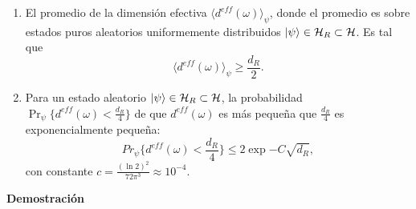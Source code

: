 \begin{theorem}\label{teorema2}

\begin{enumerate}

\item El promedio de la dimensión efectiva $\langle d^{eff}(\omega) \rangle_{\psi}$, donde el promedio es sobre estados puros aleatorios uniformemente distribuidos $\ket{\psi} \in \mathcal{H}_{R} \subset \mathcal{H}$. Es tal que
\begin{equation}
\langle d^{eff}(\omega) \rangle_{\psi} \ge \frac{d_{R}}{2}.
\end{equation}
\item Para un estado aleatorio $\ket{\psi} \in \mathcal{H}_{R} \subset \mathcal{H}$, la probabilidad $\Pr_{\psi} \{ d^{eff}(\omega) < \frac{d_{R}}{4}  \}$ de que $d^{eff}(\omega)$ es más pequeña que $\frac{d_{R}}{4}$ es exponencialmente pequeña:
\begin{equation}
Pr_{\psi} \{ d^{eff}(\omega) < \frac{d_{R}}{4}  \} \leq 2 \exp{-C \sqrt{d_{R}}},
\end{equation}
con constante $c= \frac{(\ln 2)^{2}}{72 \pi^{3}} \approx 10^{-4}$.
\end{enumerate}
\end{theorem}

\textbf{Demostración}

